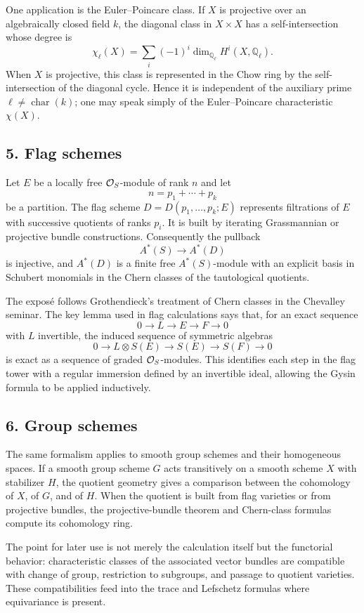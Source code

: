 \documentclass[11pt]{article}
\theoremstyle{plain}
\theoremstyle{definition}
\theoremstyle{remark}
\newcommand{\QQ}{\mathbb Q}
\begin{document}
One application is the Euler--Poincare class. If $X$ is projective over an algebraically closed field $k$, the diagonal class in $X\times X$ has a self-intersection whose degree is
\[
   \chi_\ell(X)=\sum_i (-1)^i\dim_{\QQ_\ell}H^i(X,\QQ_\ell).
\]
When $X$ is projective, this class is represented in the Chow ring by the self-intersection of the diagonal cycle. Hence it is independent of the auxiliary prime $\ell\ne\operatorname{char}(k)$; one may speak simply of the Euler--Poincare characteristic $\chi(X)$.

\subsection*{5. Flag schemes}

Let $E$ be a locally free $\mathcal O_S$-module of rank $n$ and let
\[
   n=p_1+\cdots+p_k
\]
be a partition. The flag scheme $D=D(p_1,\ldots,p_k;E)$ represents filtrations of $E$ with successive quotients of ranks $p_i$. It is built by iterating Grassmannian or projective bundle constructions. Consequently the pullback
\[
   A^*(S)\longrightarrow A^*(D)
\]
is injective, and $A^*(D)$ is a finite free $A^*(S)$-module with an explicit basis in Schubert monomials in the Chern classes of the tautological quotients.

The expos\'e follows Grothendieck's treatment of Chern classes in the Chevalley seminar. The key lemma used in flag calculations says that, for an exact sequence
\[
   0\to L\to E\to F\to0
\]
with $L$ invertible, the induced sequence of symmetric algebras
\[
   0\to L\otimes S(E)\to S(E)\to S(F)\to0
\]
is exact as a sequence of graded $\mathcal O_S$-modules. This identifies each step in the flag tower with a regular immersion defined by an invertible ideal, allowing the Gysin formula to be applied inductively.

\subsection*{6. Group schemes}

The same formalism applies to smooth group schemes and their homogeneous spaces. If a smooth group scheme $G$ acts transitively on a smooth scheme $X$ with stabilizer $H$, the quotient geometry gives a comparison between the cohomology of $X$, of $G$, and of $H$. When the quotient is built from flag varieties or from projective bundles, the projective-bundle theorem and Chern-class formulas compute its cohomology ring.

The point for later use is not merely the calculation itself but the functorial behavior: characteristic classes of the associated vector bundles are compatible with change of group, restriction to subgroups, and passage to quotient varieties. These compatibilities feed into the trace and Lefschetz formulas where equivariance is present.
\end{document}
